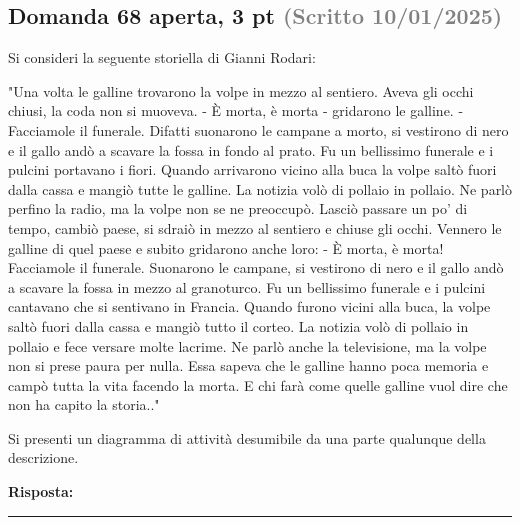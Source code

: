 \documentclass[a4paper,11pt]{article}
\begin{document}
\subsection*{Domanda 68 \hfill {\small aperta, 3 pt \textcolor{gray}{(Scritto 10/01/2025)}}}
\begin{tcolorbox}[colback=gray!8,colframe=gray!50,title=Contesto]
Si consideri la seguente storiella di Gianni Rodari:

"Una volta le galline trovarono la volpe in mezzo al sentiero. Aveva gli occhi chiusi, la coda non si muoveva. - È morta, è morta - gridarono le galline. - Facciamole il funerale. Difatti suonarono le campane a morto, si vestirono di nero e il gallo andò a scavare la fossa in fondo al prato. Fu un bellissimo funerale e i pulcini portavano i fiori. Quando arrivarono vicino alla buca la volpe saltò fuori dalla cassa e mangiò tutte le galline.
La notizia volò di pollaio in pollaio. Ne parlò perfino la radio, ma la volpe non se ne preoccupò. Lasciò passare un po' di tempo, cambiò paese, si sdraiò in mezzo al sentiero e chiuse gli occhi. Vennero le galline di quel paese e subito gridarono anche loro: - È morta, è morta! Facciamole il funerale.
Suonarono le campane, si vestirono di nero e il gallo andò a scavare la fossa in mezzo al granoturco. Fu un bellissimo funerale e i pulcini cantavano che si sentivano in Francia. Quando furono vicini alla buca, la volpe saltò fuori dalla cassa e mangiò tutto il corteo.
La notizia volò di pollaio in pollaio e fece versare molte lacrime. Ne parlò anche la televisione, ma la volpe non si prese paura per nulla. Essa sapeva che le galline hanno poca memoria e campò tutta la vita facendo la morta. E chi farà come quelle galline vuol dire che non ha capito la storia.."
\end{tcolorbox}
Si presenti un diagramma di attività desumibile da una parte qualunque della descrizione.

\vspace{0.2cm}
\noindent\textbf{Risposta:}\par
\vspace{4cm}\hrule


\end{document}
